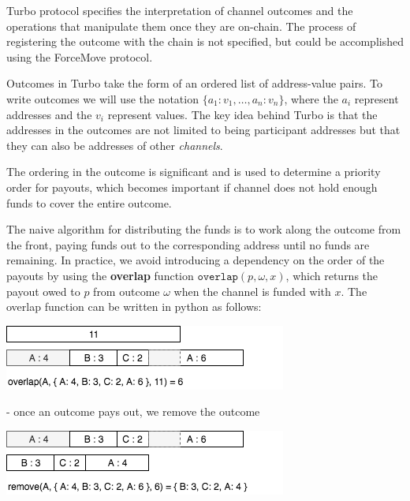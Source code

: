 \documentclass{article}
\theoremstyle{definition}
\begin{document}
Turbo protocol specifies the interpretation of channel outcomes and the operations that
manipulate them once they are on-chain.
The process of registering the outcome with the chain is not specified, but could be accomplished
using the ForceMove protocol.

Outcomes in Turbo take the form of an ordered list of address-value pairs.
To write outcomes we will use the notation $\{a_1{:}v_1, \dots, a_n{:}v_n \}$, where the $a_i$
represent addresses and the $v_i$ represent values.
The key idea behind Turbo is that the addresses in the outcomes are not limited to being
participant addresses but that they can also be addresses of other \textit{channels}.

The ordering in the outcome is significant and is used to determine a priority order for payouts,
which becomes important if channel does not hold enough funds to cover the entire outcome.

The naive algorithm for distributing the funds is to work along the outcome from the front,
paying funds out to the corresponding address until no funds are remaining.
In practice, we avoid introducing a dependency on the order of the payouts by using
the \textbf{overlap} function $\texttt{overlap}(p, \omega, x)$, which returns the payout owed
to $p$ from outcome $\omega$ when the channel is funded with $x$.
The overlap function can be written in python as follows:

\begin{minipage}{\linewidth} %
  
\end{minipage}




\begin{center}
  \includegraphics[scale=0.7]{overlap} %
\end{center}

- once an outcome pays out, we remove the outcome

\begin{center}
  \includegraphics[scale=0.7]{remove} %
\end{center}

\end{document}
